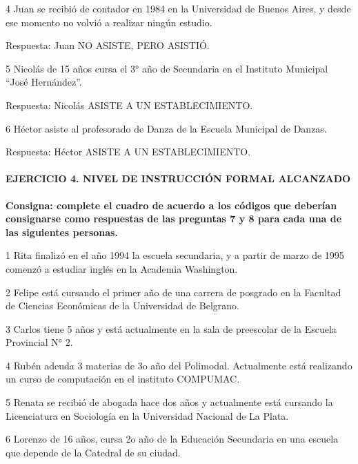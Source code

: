 \documentclass[
  openany]{book}
\begin{document}
4 Juan se recibió de contador en 1984 en la Universidad de Buenos Aires, y desde ese momento no volvió a realizar ningún estudio.

Respuesta: Juan NO ASISTE, PERO ASISTIÓ.

5 Nicolás de 15 años cursa el 3° año de Secundaria en el Instituto Municipal ``José Hernández''.

Respuesta: Nicolás ASISTE A UN ESTABLECIMIENTO.

6 Héctor asiste al profesorado de Danza de la Escuela Municipal de Danzas.

Respuesta: Héctor ASISTE A UN ESTABLECIMIENTO.

\hypertarget{ejercicio-4.-nivel-de-instrucciuxf3n-formal-alcanzado-1}{%
\paragraph{\texorpdfstring{\textbf{EJERCICIO 4. NIVEL DE INSTRUCCIÓN FORMAL ALCANZADO}}{EJERCICIO 4. NIVEL DE INSTRUCCIÓN FORMAL ALCANZADO}}\label{ejercicio-4.-nivel-de-instrucciuxf3n-formal-alcanzado-1}}

\textbf{Consigna: complete el cuadro de acuerdo a los códigos que deberían consignarse como respuestas de las preguntas 7 y 8 para cada una de las siguientes personas.}

1 Rita finalizó en el año 1994 la escuela secundaria, y a partir de marzo de 1995 comenzó a estudiar inglés en la Academia Washington.

2 Felipe está cursando el primer año de una carrera de posgrado en la Facultad de Ciencias Económicas de la Universidad de Belgrano.

3 Carlos tiene 5 años y está actualmente en la sala de preescolar de la Escuela Provincial N° 2.

4 Rubén adeuda 3 materias de 3o año del Polimodal. Actualmente está realizando un curso de computación en el instituto COMPUMAC.

5 Renata se recibió de abogada hace dos años y actualmente está cursando la Licenciatura en Sociología en la Universidad Nacional de La Plata.

6 Lorenzo de 16 años, cursa 2o año de la Educación Secundaria en una escuela que depende de la Catedral de su ciudad.
\end{document}
